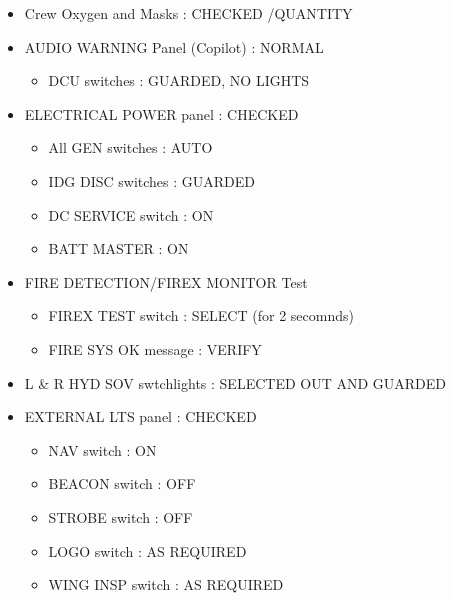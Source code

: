 \begin{itemize}
\item Crew Oxygen and Masks : CHECKED \slash  QUANTITY

\item AUDIO WARNING Panel (Copilot) : NORMAL

\begin{itemize}
\item DCU switches : GUARDED, NO LIGHTS

\end{itemize}

\item ELECTRICAL POWER panel : CHECKED

\begin{itemize}
\item All GEN switches : AUTO

\item IDG DISC switches : GUARDED

\item DC SERVICE switch : ON

\item BATT MASTER : ON

\end{itemize}

\item FIRE DETECTION\slash FIREX MONITOR Test

\begin{itemize}
\item FIREX TEST switch : SELECT (for 2 secomnds)

\item FIRE SYS OK message : VERIFY

\end{itemize}

\item L \& R HYD SOV swtchlights : SELECTED OUT AND GUARDED

\item EXTERNAL LTS panel : CHECKED

\begin{itemize}
\item NAV switch : ON

\item BEACON switch : OFF

\item STROBE switch : OFF

\item LOGO switch : AS REQUIRED

\item WING INSP switch : AS REQUIRED


\end{itemize}
\end{itemize}
